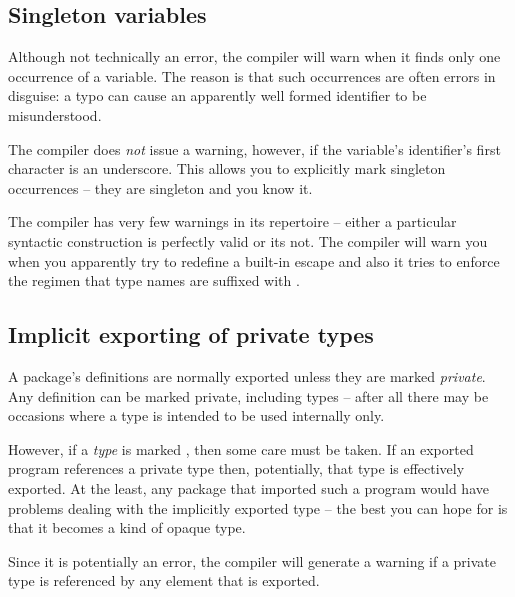 
\subsection{Singleton variables}
\label{type:singleton}
Although not technically an error, the compiler will warn when it finds only one occurrence of a variable. The reason is that such occurrences are often errors in disguise: a typo can cause an apparently well formed identifier to be misunderstood.

The compiler does \emph{not} issue a warning, however, if the variable's identifier's first character is an underscore. This allows you to explicitly mark singleton occurrences -- they are singleton and you know it.

The \go compiler has very few warnings in its repertoire -- either a particular syntactic construction is perfectly valid or its not. The compiler will warn you when you apparently try to redefine a built-in escape and also it tries to enforce the regimen that type names are suffixed with \q{[]}.

\subsection{Implicit exporting of private types}
\label{type:implicit:export}
A package's definitions are normally exported unless they are marked \emph{private}. Any definition can be marked private, including types -- after all there may be occasions where a type is intended to be used internally only.

However, if a \emph{type} is marked , then some care must be taken. If an exported program references a private type then, potentially, that type is effectively exported. At the least, any package that imported such a program would have problems dealing with the implicitly exported type -- the best you can hope for is that it becomes a kind of opaque type.

Since it is potentially an error, the compiler will generate a warning if a private type is referenced by any element that is exported.







